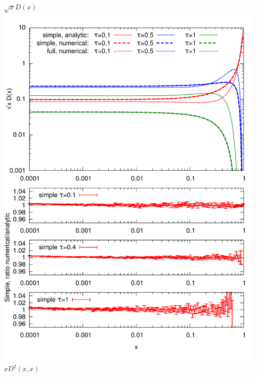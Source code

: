 \documentclass[pstricks,mathserif]{beamer}
\begin{document}
\begin{frame}
\centering
\small $\sqrt{x} D(x)$
\includegraphics[width=1\linewidth]{times.pdf}
\endminipage\hfill
{}
\centering
\small $x D^2(x,x)$

\end{frame}
\end{document}
